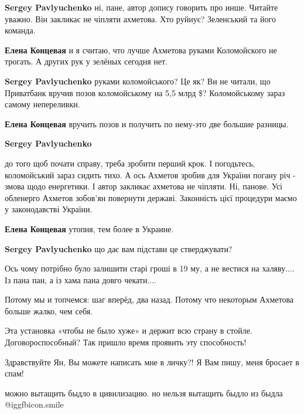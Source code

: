 \begin{itemize}
\begin{itemize}
\textbf{Sergey Pavlyuchenko} ні, пане, автор допису говорить про инше. Читайте уважно. Він закликає не чіпляти ахметова.
Хто руйнує? Зеленський та його команда.

\textbf{Елена Концевая} и я считаю, что лучше Ахметова руками Коломойского не трогать. А других рук у зелёных сегодня нет.

\textbf{Sergey Pavlyuchenko} руками коломойського? Це як? Ви не читали, що Приватбанк вручив позов коломойському на 5,5 млрд \$? Коломойському зараз самому непереливки.

\textbf{Елена Концевая} вручить позов и получить по нему-это две большие разницы.

\textbf{Sergey Pavlyuchenko} 

до того щоб почати справу, треба зробити перший крок. І погодьтесь,
коломойський зараз сидить тихо. А ось Ахметов зробив для України погану річ -
змова щодо енергетики. І автор закликає ахметова не чіпляти. Ні, панове. Усі
обленерго Ахметов зобов'ян повернути державі. Законність цієї процедури маємо у
законодавстві України.


\textbf{Елена Концевая} утопия, тем более в Украине.

\textbf{Sergey Pavlyuchenko} що дає вам підстави це стверджувати?


\end{itemize} %


Ось чому потрібно було залишити старі гроші в 19 му, а не вестися на халяву....
Із пана пан, а із хама пана довго чекати....


Потому мы и топчемся: шаг вперёд, два назад. Потому что некоторым Ахметова
больше жалко, чем себя.


Эта установка «чтобы не было хуже» и держит всю страну в стойле.
Договороспособный? Так пришло время проявить эту способность!


Здравствуйте Ян, Вы можете написать мне в личку?! Я Вам пишу, меня бросает в
спам!


можно вытащить быдло в цивилизацию. но нельзя вытащить быдло из быдла
@igg{fbicon.smile} 


\end{itemize} %
